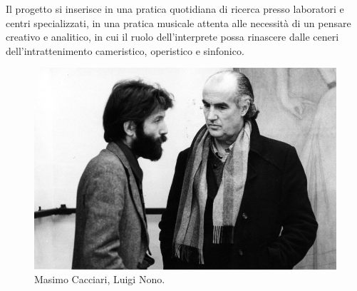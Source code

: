 \documentclass{gs-adonis}
\begin{document}
Il progetto si inserisce in una pratica quotidiana di ricerca presso laboratori
e centri specializzati, in una pratica musicale attenta alle necessità di un
pensare creativo e analitico, in cui il ruolo dell'interprete possa rinascere
dalle ceneri dell'intrattenimento cameristico, operistico e sinfonico.

\begin{figure}[ht]
  \centering
  \includegraphics[width=\linewidth]{images/luigi-nono-massimo-cacciari.jpg}
  \captionsetup{width=.81\linewidth}
  \caption{Masimo Cacciari, Luigi Nono.}
  \label{cacciari}
\end{figure}


%
\end{document}
